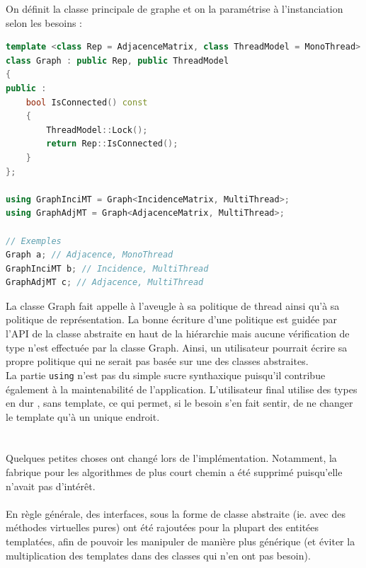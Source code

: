 On définit la classe principale de graphe et on la paramétrise à l'instanciation selon les besoins :
\begin{lstlisting}[label=policy_3,caption=Illustration de la paramétrisation,language=C++]
template <class Rep = AdjacenceMatrix, class ThreadModel = MonoThread>
class Graph : public Rep, public ThreadModel
{
public :
    bool IsConnected() const
    {
        ThreadModel::Lock();
        return Rep::IsConnected();
    }
};

using GraphInciMT = Graph<IncidenceMatrix, MultiThread>;
using GraphAdjMT = Graph<AdjacenceMatrix, MultiThread>;

// Exemples
Graph a; // Adjacence, MonoThread
GraphInciMT b; // Incidence, MultiThread
GraphAdjMT c; // Adjacence, MultiThread

\end{lstlisting}

La classe Graph fait appelle à l'aveugle à sa politique de thread ainsi qu'à sa politique de représentation. La bonne écriture d'une politique est guidée par l'API de la classe abstraite en haut de la hiérarchie mais aucune vérification de type n'est effectuée par la classe Graph. Ainsi, un utilisateur pourrait écrire sa propre politique qui ne serait pas basée sur une des classes abstraites.\\
La partie \verb|using| n'est pas du simple sucre synthaxique puisqu'il contribue également à la maintenabilité de l'application. L'utilisateur final utilise des types en \og{} dur \fg, sans template, ce qui permet, si le besoin s'en fait sentir, de ne changer le template qu'à un unique endroit.

\section{{\color{red}{Notes sur la modélisation}}}

Quelques petites choses ont changé lors de l'implémentation. Notamment, la fabrique pour les algorithmes de plus court chemin a été supprimé puisqu'elle n'avait pas d'intérêt.\\\\

En règle générale, des interfaces, sous la forme de classe abstraite (ie. avec des méthodes virtuelles pures) ont été rajoutées pour la plupart des entitées templatées, afin de pouvoir les manipuler de manière plus générique (et éviter la multiplication des templates dans des classes qui n'en ont pas besoin).\\\\

